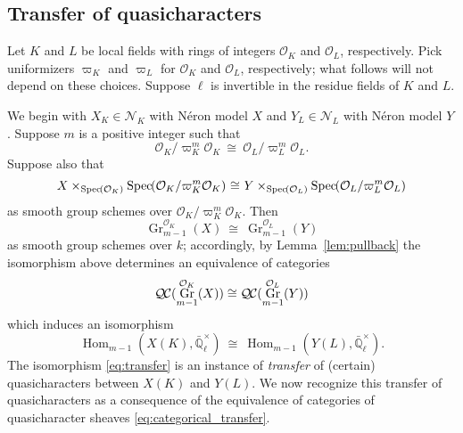 \documentclass[CM,Submssn,SecEq]{degruyter-crelle} %
\theoremstyle{plain}
\theoremstyle{definition}
\theoremstyle{remark}
\newcommand{\EE}{\mathbb{\bar Q}_\ell}
\newcommand{\OK}{\mathcal{O}_K}
\newcommand{\OL}{\mathcal{O}_L}
\newcommand{\Fq}{k}
\newcommand{\EEx}{\EE^\times}
\DeclareMathOperator{\Hom}{Hom}
\DeclareMathOperator{\Gr}{Gr}
\newcommand{\Spec}[1]{{\operatorname{Spec}\hskip-1pt( #1 )}}
\newcommand{\iso}{{\ \cong\ }}
\newcommand{\QC}{{\mathcal{Q\hskip-0.8pt C}}}
\begin{document}
\subsection{Transfer of quasicharacters}\label{ssec:transfer}

Let $K$ and $L$ be local fields with rings of integers $\OK$ and $\OL$, respectively. 
Pick uniformizers $\varpi_K$ and $\varpi_L$ for $\OK$ and $\OL$, respectively;
what follows will not depend on these choices.
Suppose $\ell$ is invertible in the residue fields of $K$ and $L$.

We begin with $X_K\in \mathcal{N}_K$ with N\'eron model $X$ and $Y_{L}\in \mathcal{N}_L$ with N\'eron model $Y$.
Suppose $m$ is a positive integer such that 
\[
\OK/\varpi_K^{m}\OK \iso \OL/\varpi_L^{m}\OL.
\]
Suppose also that
\begin{equation}\label{eq:schematic_transfer}
X \times_{\Spec{\OK}} \Spec{\OK/\varpi_K^{m}\OK} \iso Y \times_{\Spec{\OL}} \Spec{\OL/\varpi_L^{m}\OL}
\end{equation}
as smooth group schemes over $\OK/\varpi_K^{m}\OK$. 
Then
\[
\Gr^{\OK}_{m-1}(X) \iso \Gr^{\OL}_{m-1}(Y)
\]
as smooth group schemes over $\Fq$; accordingly, by Lemma~\ref{lem:pullback} the isomorphism above determines an equivalence of categories
\begin{equation}\label{eq:categorical_transfer}
\QC(\Gr^{\OK}_{m-1}(X)) \cong \QC(\Gr^{\OL}_{m-1}(Y))
\end{equation}
which induces an isomorphism
\begin{equation}\label{eq:transfer}
\Hom_{m-1}(X(K),\EEx)  \iso  \Hom_{m-1}(Y(L),\EEx).
\end{equation}
The isomorphism \eqref{eq:transfer} is an instance of {\it transfer} of (certain) quasicharacters between $X(K)$ and $Y(L)$. 
We now recognize this transfer of quasicharacters as a consequence of the equivalence of categories of quasicharacter sheaves \eqref{eq:categorical_transfer}.
\end{document}

